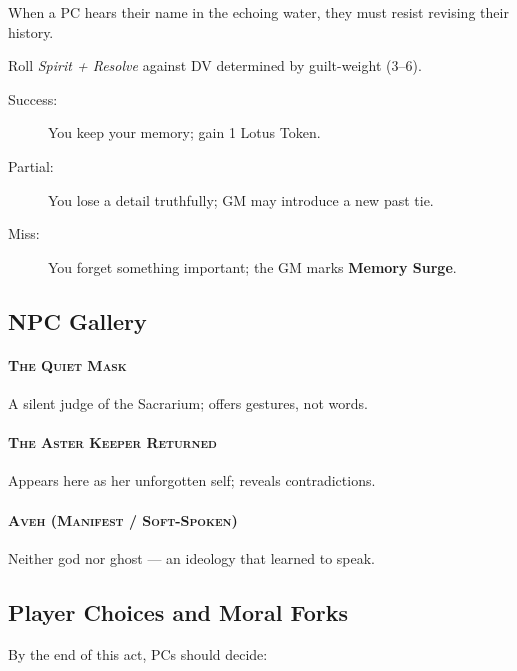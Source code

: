 \documentclass[11pt]{article}
\newcommand{\Term}[1]{\textbf{#1}}
\newcommand{\NPC}[1]{\textsc{#1}}
\begin{document}
When a PC hears their name in the echoing water,
they must resist revising their history.

\begin{tcolorbox}[title=\textbf{Memory Trial},colback=purple!5!white,
colframe=purple!70!black,breakable]
Roll \emph{Spirit + Resolve} against DV determined by guilt-weight (3--6).

\begin{description}
  \item[Success:] You keep your memory; gain 1 Lotus Token.
  \item[Partial:] You lose a detail truthfully; GM may introduce a new past tie.
  \item[Miss:] You forget something important; the GM marks \Term{Memory Surge}.
\end{description}
\end{tcolorbox}

\bigskip

\subsection*{NPC Gallery}

\paragraph{\NPC{The Quiet Mask}}
A silent judge of the Sacrarium; offers gestures, not words.

\paragraph{\NPC{The Aster Keeper Returned}}
Appears here as her unforgotten self; reveals contradictions.

\paragraph{\NPC{Aveh (Manifest / Soft-Spoken)}}
Neither god nor ghost --- an ideology that learned to speak.

\bigskip

\subsection*{Player Choices and Moral Forks}

By the end of this act, PCs should decide:
\end{document}
